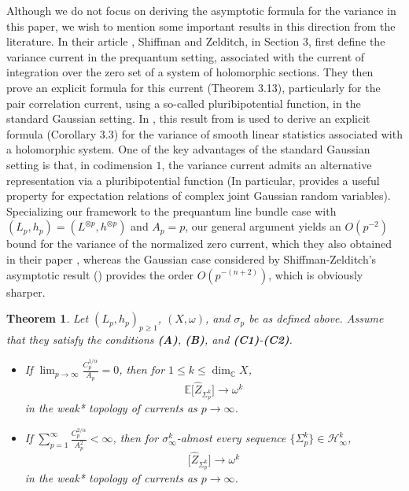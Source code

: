 \documentclass[11pt,leqno,oneside]{amsart}
\newtheorem{thm}{Theorem}[section]
\numberwithin{equation}{section}
\begin{document}
Although we do not focus on deriving the asymptotic formula for the variance in this paper, we wish to mention some important results in this direction from the literature. In their article \cite{SZ08}, Shiffman and Zelditch, in Section 3, first define the variance current in the prequantum setting, associated with the current of integration over the zero set of a system of holomorphic sections. They then prove an explicit formula for this current (Theorem 3.13), particularly for the pair correlation current, using a so-called pluribipotential function, in the standard Gaussian setting. In \cite{SZ10}, this result from \cite{SZ08} is used to derive an explicit formula (Corollary 3.3) for the variance of smooth linear statistics associated with a holomorphic system. One of the key advantages of the standard Gaussian setting is that, in codimension $1$, the variance current admits an alternative representation via a pluribipotential function (In particular, \cite[lemma 3.3]{SZ08} provides a useful property for expectation relations of complex joint Gaussian random variables). Specializing our framework to the prequantum line bundle case with $(L_{p}, h_{p})=(L^{\otimes p}, h^{\otimes p})$ and $A_p=p$, our general argument yields an $O(p^{-2})$ bound for the variance of the normalized zero current, which they also obtained in their paper \cite{SZ99}, whereas the Gaussian case considered by Shiffman-Zelditch's asymptotic result (\cite[Theorem 1.1]{SZ10}) provides the order $O(p^{-(n+2)})$, which is obviously sharper.

\begin{thm}\label{th2}
	Let \( (L_{p}, h_{p})_{p \geq 1} \), \( (X, \omega) \), and \( \sigma_{p} \) be as defined above. Assume that they satisfy the conditions \textbf{(A)}, \textbf{(B)}, and \textbf{(C1)}-\textbf{(C2)}.
	
	\begin{itemize}
		\item [(i)] If \( \lim_{p \to \infty} \frac{C_{p}^{1/\alpha}}{A_{p}} = 0 \), then for \( 1 \leq k \leq \dim_{\mathbb{C}} X \),
		$$
		\mathbb{E}\big[\widehat{Z}_{\Sigma_{p}^{k}}\big] \longrightarrow \omega^k
		$$
		in the weak* topology of currents as \( p \to \infty \).
		
		\item [(ii)] If \( \sum_{p=1}^{\infty} \frac{C_{p}^{2/\alpha}}{A_{p}^{2}} < \infty \), then for \( \sigma_{\infty}^{k} \)-almost every sequence \( \{\Sigma_{p}^{k}\} \in \mathcal{H}_{\infty}^{k} \),
		$$
		\big[\widehat{Z}_{\Sigma_{p}^{k}}\big] \longrightarrow \omega^k
		$$
		in the weak* topology of currents as \( p \to \infty \).
	\end{itemize}
\end{thm}
\end{document}
